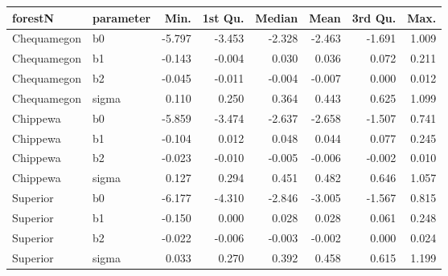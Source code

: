 \begin{table}[ht]
\begin{center}
\begin{tabular}{llrrrrrr}
  \hline
forestN & parameter & Min. & 1st Qu. & Median & Mean & 3rd Qu. & Max. \\ 
  \hline
Chequamegon & b0 & -5.797 & -3.453 & -2.328 & -2.463 & -1.691 & 1.009 \\ 
  Chequamegon & b1 & -0.143 & -0.004 & 0.030 & 0.036 & 0.072 & 0.211 \\ 
  Chequamegon & b2 & -0.045 & -0.011 & -0.004 & -0.007 & 0.000 & 0.012 \\ 
  Chequamegon & sigma & 0.110 & 0.250 & 0.364 & 0.443 & 0.625 & 1.099 \\ 
  Chippewa & b0 & -5.859 & -3.474 & -2.637 & -2.658 & -1.507 & 0.741 \\ 
  Chippewa & b1 & -0.104 & 0.012 & 0.048 & 0.044 & 0.077 & 0.245 \\ 
  Chippewa & b2 & -0.023 & -0.010 & -0.005 & -0.006 & -0.002 & 0.010 \\ 
  Chippewa & sigma & 0.127 & 0.294 & 0.451 & 0.482 & 0.646 & 1.057 \\ 
  Superior & b0 & -6.177 & -4.310 & -2.846 & -3.005 & -1.567 & 0.815 \\ 
  Superior & b1 & -0.150 & 0.000 & 0.028 & 0.028 & 0.061 & 0.248 \\ 
  Superior & b2 & -0.022 & -0.006 & -0.003 & -0.002 & 0.000 & 0.024 \\ 
  Superior & sigma & 0.033 & 0.270 & 0.392 & 0.458 & 0.615 & 1.199 \\ 
   \hline
\end{tabular}
\end{center}
\end{table}
